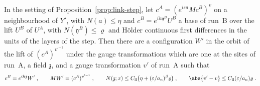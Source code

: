 
\begin{lemma}\label{lem:link-lift}
In the setting of Proposition~\ref{prop:link-step}, let $c^A = (e^{i\varepsilon a}Mc^B)^v$ on a neighbourhood of $Y'$, with $N(a) \leq \eta$ and $c^B = e^{ih\mathfrak y^B}U^B$ a base of run~B over the lift $U^B$ of $U^A$, with $N(\mathfrak y^B) \leq \varrho$ and H\"older continuous first differences in the units of the layers of the step. Then there are a configuration $W'$ in the orbit of the lift of $(c^A)^{v'^{-1}}$ under the gauge transformations which are one at the sites of run~A, a field $\mathfrak z$, and a gauge transformation $v'$ of run~A such that
\[
    c^B = e^{ih\mathfrak z}W'\;,
    \qquad
    MW' = (c^A)^{v'^{-1}}\;,
    \qquad
    N(\mathfrak z; x) \leq C_{\mathrm{ll}}\bigl(\eta + (\varepsilon/a_n)^\beta\varrho\bigr)\;,
    \qquad
    \abs{v' - v} \leq C_{\mathrm{ll}}(\varepsilon/a_n)\varrho\;.
\]
\end{lemma}

